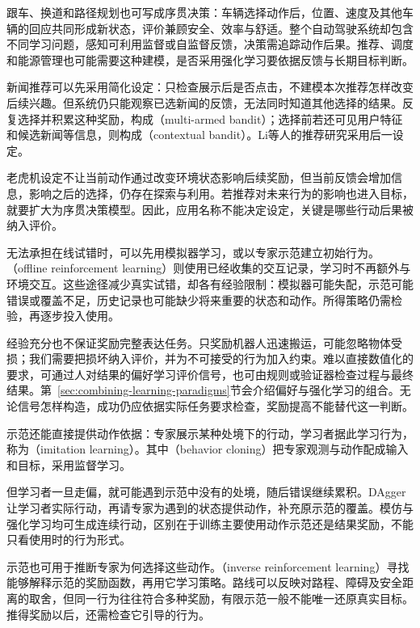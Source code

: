 跟车、换道和路径规划也可写成序贯决策：车辆选择动作后，位置、速度及其他车辆的回应共同形成新状态，评价兼顾安全、效率与舒适。整个自动驾驶系统却包含不同学习问题，感知可利用监督或自监督反馈，决策需追踪动作后果。推荐、调度和能源管理也可能需要这种建模，是否采用强化学习要依据反馈与长期目标判断。

新闻推荐可以先采用简化设定：只检查展示后是否点击，不建模本次推荐怎样改变后续兴趣。但系统仍只能观察已选新闻的反馈，无法同时知道其他选择的结果。反复选择并积累这种奖励，构成（multi-armed bandit）；选择前若还可见用户特征和候选新闻等信息，则构成（contextual bandit）。Li等人的推荐研究采用后一设定。

老虎机设定不让当前动作通过改变环境状态影响后续奖励，但当前反馈会增加信息，影响之后的选择，仍存在探索与利用。若推荐对未来行为的影响也进入目标，就要扩大为序贯决策模型。因此，应用名称不能决定设定，关键是哪些行动后果被纳入评价。

无法承担在线试错时，可以先用模拟器学习，或以专家示范建立初始行为。（offline reinforcement learning）则使用已经收集的交互记录，学习时不再额外与环境交互。这些途径减少真实试错，却各有经验限制：模拟器可能失配，示范可能错误或覆盖不足，历史记录也可能缺少将来重要的状态和动作。所得策略仍需检验，再逐步投入使用。

经验充分也不保证奖励完整表达任务。只奖励机器人迅速搬运，可能忽略物体受损；我们需要把损坏纳入评价，并为不可接受的行为加入约束。难以直接数值化的要求，可通过人对结果的偏好学习评价信号，也可由规则或验证器检查过程与最终结果。第~\ref{sec:combining-learning-paradigms}节会介绍偏好与强化学习的组合。无论信号怎样构造，成功仍应依据实际任务要求检查，奖励提高不能替代这一判断。

示范还能直接提供动作依据：专家展示某种处境下的行动，学习者据此学习行为，称为（imitation learning）。其中（behavior cloning）把专家观测与动作配成输入和目标，采用监督学习。

但学习者一旦走偏，就可能遇到示范中没有的处境，随后错误继续累积。DAgger让学习者实际行动，再请专家为遇到的状态提供动作，补充原示范的覆盖。模仿与强化学习均可生成连续行动，区别在于训练主要使用动作示范还是结果奖励，不能只看使用时的行为形式。

示范也可用于推断专家为何选择这些动作。（inverse reinforcement learning）寻找能够解释示范的奖励函数，再用它学习策略。路线可以反映对路程、障碍及安全距离的取舍，但同一行为往往符合多种奖励，有限示范一般不能唯一还原真实目标。推得奖励以后，还需检查它引导的行为。


